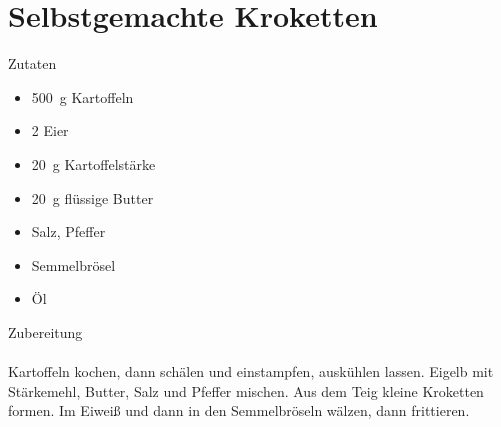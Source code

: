 \section*{Selbstgemachte Kroketten}
\ihead{}\ohead{}
\cfoot{}
{\Large Zutaten}
\begin{multicols}{2}
\begin{itemize}
    \item \SI{500}{g} Kartoffeln
    \item \num{2} Eier
    \item \SI{20}{g} Kartoffelstärke
    \item \SI{20}{g} flüssige Butter
    \item Salz, Pfeffer
    \item Semmelbrösel
    \item Öl
\end{itemize}
\end{multicols}
\noindent
{\Large Zubereitung}\\
\\
Kartoffeln kochen, dann schälen und einstampfen, auskühlen lassen.
Eigelb mit Stärkemehl, Butter, Salz und Pfeffer mischen.
Aus dem Teig kleine Kroketten formen.
Im Eiweiß und dann in den Semmelbröseln wälzen, dann frittieren. 